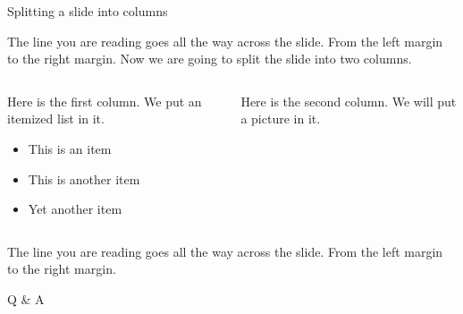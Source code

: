 \documentclass[xcolor=svgnames]{beamer}
\begin{document}
\begin{frame}{Splitting a slide into columns}

The line you are reading goes all the way across the slide.
From the left margin to the right margin.  Now we are going
to split the slide into two columns.
\bigskip

\begin{columns}
  \begin{column}{0.5\textwidth}
    Here is the first column.  We put an itemized list in it.
    \begin{itemize}
      \item This is an item
      \item This is another item
      \item Yet another item
    \end{itemize}
  \end{column}

  \begin{column}{0.3\textwidth}
    Here is the second column.  We will put a picture in it.
   
  \end{column}
\end{columns}
\bigskip
The line you are reading goes all the way across the slide.
From the left margin to the right margin.
\end{frame}
\begin{frame}[c]{} %
    \begin{center}\Huge
        Q \& A
    \end{center}
\end{frame} 
\end{document}
